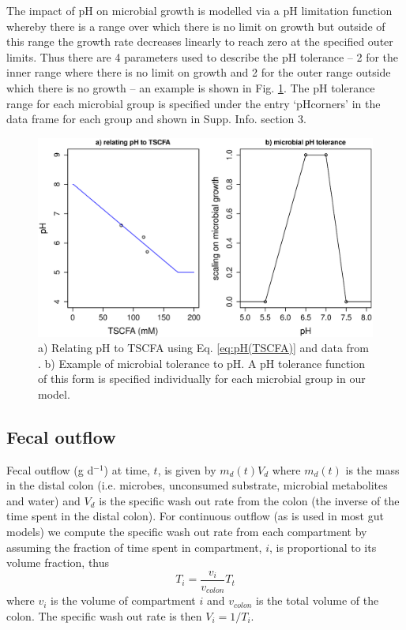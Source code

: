 \documentclass[a4paper]{article}
\begin{document}
The impact of pH on microbial growth is modelled via a pH limitation function whereby there is a range over which there is no limit on growth but outside of this range the growth rate decreases linearly to reach zero at the specified outer limits. Thus there are 4 parameters used to describe the pH tolerance -- 2 for the inner range where there is no limit on growth and 2 for the outer range outside which there is no growth -- an example is shown in Fig. \ref{fig:pHRelandTol}.
The pH tolerance range for each microbial group is specified under the entry `pHcorners' in the data frame for each group and shown in Supp. Info. section 3.

\begin{figure}
    \centering
    \includegraphics[scale=0.3]{images/pHTSCFAandTol.eps}
    \caption{a) Relating pH to TSCFA using Eq. \ref{eq:pH(TSCFA)} and data from \citep{cummings}. b) Example of microbial tolerance to pH. 
A pH tolerance function of this form is specified individually for each microbial group in our model.  
}
    \label{fig:pHRelandTol}
\end{figure}


\subsection*{Fecal outflow}
Fecal outflow (g d$^{-1}$) at time, $t$, is given by $m_d(t)V_d$ where $m_d(t)$ is the mass in the distal colon (i.e. microbes, unconsumed substrate, microbial metabolites and water) and $V_d$ is the specific wash out rate from the colon (the inverse of the time spent in the distal colon).
For continuous outflow (as is used in most gut models) we compute the specific wash out rate from each compartment by assuming the fraction of time spent in compartment, $i$, is proportional to its volume fraction, thus 
\begin{equation}
    T_i=\frac{v_i}{v_{colon}}T_t
\end{equation}
where $v_i$ is the volume of compartment $i$ and $v_{colon}$ is the total volume of the colon. The specific wash out rate is then $V_i=1/T_i$.
\end{document}
